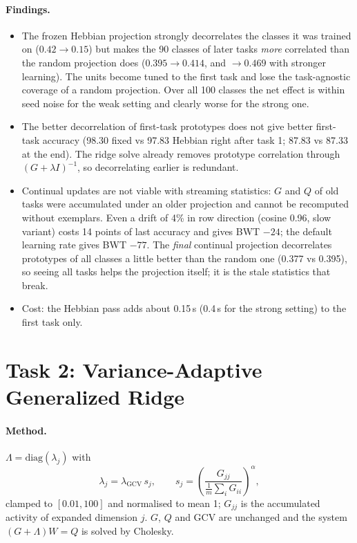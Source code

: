 \documentclass[11pt,a4paper]{article}
\begin{document}
\paragraph{Findings.}
\begin{itemize}
  \item The frozen Hebbian projection strongly decorrelates the classes it was trained on
        ($0.42 \to 0.15$) but makes the 90 classes of later tasks \emph{more} correlated than the
        random projection does ($0.395 \to 0.414$, and $\to 0.469$ with stronger learning). The
        units become tuned to the first task and lose the task-agnostic coverage of a random
        projection. Over all 100 classes the net effect is within seed noise for the weak setting
        and clearly worse for the strong one.
  \item The better decorrelation of first-task prototypes does not give better first-task accuracy
        (98.30 fixed vs 97.83 Hebbian right after task 1; 87.83 vs 87.33 at the end). The ridge
        solve already removes prototype correlation through $(G + \lambda I)^{-1}$, so decorrelating
        earlier is redundant.
  \item Continual updates are not viable with streaming statistics: $G$ and $Q$ of old tasks were
        accumulated under an older projection and cannot be recomputed without exemplars. Even a
        drift of 4\% in row direction (cosine 0.96, slow variant) costs 14 points of last accuracy
        and gives BWT $-24$; the default learning rate gives BWT $-77$. The \emph{final} continual
        projection decorrelates prototypes of all classes a little better than the random one
        (0.377 vs 0.395), so seeing all tasks helps the projection itself; it is the stale
        statistics that break.
  \item Cost: the Hebbian pass adds about 0.15\,s (0.4\,s for the strong setting) to the first task only.
\end{itemize}

\section{Task 2: Variance-Adaptive Generalized Ridge}

\paragraph{Method.} $\Lambda = \mathrm{diag}(\lambda_j)$ with
\[
\lambda_j = \lambda_{\mathrm{GCV}}\, s_j, \qquad
s_j = \left( \frac{G_{jj}}{\tfrac{1}{m}\sum_i G_{ii}} \right)^{\alpha},
\]
clamped to $[0.01, 100]$ and normalised to mean 1; $G_{jj}$ is the accumulated activity of
expanded dimension $j$. $G$, $Q$ and GCV are unchanged and the system $(G + \Lambda) W = Q$ is
solved by Cholesky.
\end{document}
